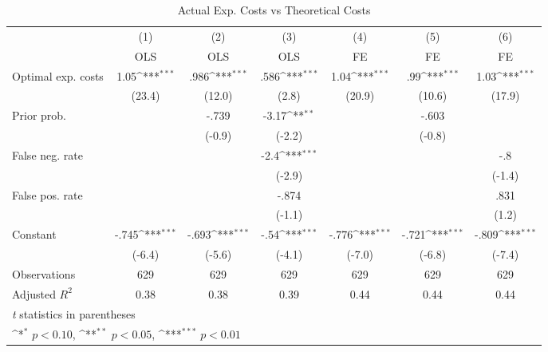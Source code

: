 \begin{table}[htbp]\centering
\def\sym#1{\ifmmode^{#1}\else\(^{#1}\)\fi}
\caption{Actual Exp. Costs vs Theoretical Costs}
\begin{tabular}{l*{6}{c}}
\hline\hline
                &\multicolumn{1}{c}{(1)}&\multicolumn{1}{c}{(2)}&\multicolumn{1}{c}{(3)}&\multicolumn{1}{c}{(4)}&\multicolumn{1}{c}{(5)}&\multicolumn{1}{c}{(6)}\\
                &\multicolumn{1}{c}{OLS}&\multicolumn{1}{c}{OLS}&\multicolumn{1}{c}{OLS}&\multicolumn{1}{c}{FE}&\multicolumn{1}{c}{FE}&\multicolumn{1}{c}{FE}\\
\hline
Optimal exp. costs&     1.05\sym{***}&     .986\sym{***}&     .586\sym{***}&     1.04\sym{***}&      .99\sym{***}&     1.03\sym{***}\\
                &   (23.4)         &   (12.0)         &    (2.8)         &   (20.9)         &   (10.6)         &   (17.9)         \\
Prior prob.     &                  &    -.739         &    -3.17\sym{**} &                  &    -.603         &                  \\
                &                  &   (-0.9)         &   (-2.2)         &                  &   (-0.8)         &                  \\
False neg. rate &                  &                  &     -2.4\sym{***}&                  &                  &      -.8         \\
                &                  &                  &   (-2.9)         &                  &                  &   (-1.4)         \\
False pos. rate &                  &                  &    -.874         &                  &                  &     .831         \\
                &                  &                  &   (-1.1)         &                  &                  &    (1.2)         \\
Constant        &    -.745\sym{***}&    -.693\sym{***}&     -.54\sym{***}&    -.776\sym{***}&    -.721\sym{***}&    -.809\sym{***}\\
                &   (-6.4)         &   (-5.6)         &   (-4.1)         &   (-7.0)         &   (-6.8)         &   (-7.4)         \\
\hline
Observations    &      629         &      629         &      629         &      629         &      629         &      629         \\
Adjusted \(R^{2}\)&     0.38         &     0.38         &     0.39         &     0.44         &     0.44         &     0.44         \\
\hline\hline
\multicolumn{7}{l}{\footnotesize \textit{t} statistics in parentheses}\\
\multicolumn{7}{l}{\footnotesize \sym{*} \(p<0.10\), \sym{**} \(p<0.05\), \sym{***} \(p<0.01\)}\\
\end{tabular}
\end{table}
